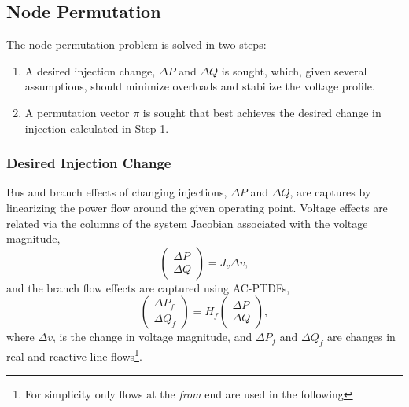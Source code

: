 \documentclass[12pt]{article}
\numberwithin{equation}{section}
\numberwithin{table}{section}
\numberwithin{figure}{section}
\begin{document}
\subsection{Node Permutation} \label{sec:vm_node}
The node permutation problem is solved in two steps:
\begin{enumerate}
	\item A desired injection change, $\Delta P$ and $\Delta Q$ is sought, which, given several assumptions, should minimize overloads and stabilize the voltage profile.
	\item A permutation vector $\pi$ is sought that best achieves the desired change in injection calculated in Step 1.
\end{enumerate}

\subsubsection{Desired Injection Change}
Bus and branch effects of changing injections, $\Delta P$ and $\Delta Q$, are captures by linearizing the power flow around the given operating point. 
Voltage effects are related via the columns of the system Jacobian associated with the voltage magnitude,
\begin{equation}
	\begin{pmatrix} \Delta P \\ \Delta Q \end{pmatrix} = J_v \Delta v,
\end{equation}
and the branch flow effects are captured using AC-PTDFs,
\begin{equation}
	\begin{pmatrix} \Delta P_f \\ \Delta Q_f \end{pmatrix} = H_f \begin{pmatrix} \Delta P \\ \Delta Q \end{pmatrix},
\end{equation}
where $ \Delta v$, is the change in voltage magnitude, and $\Delta P_f$ and $\Delta Q_f$ are changes in real and reactive line flows\footnote{
For simplicity only flows at the \emph{from} end are used in the following}.
\end{document}
